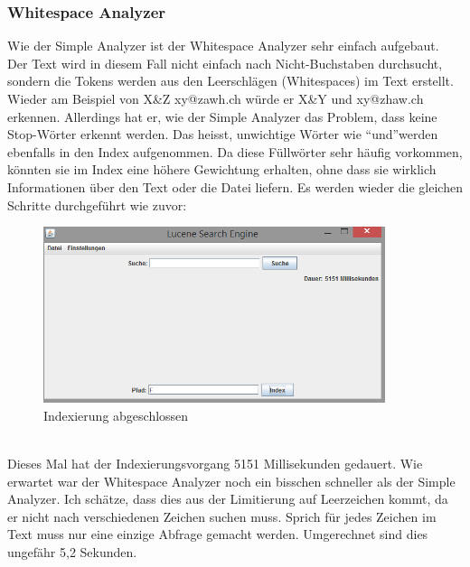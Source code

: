 \documentclass[12pt,a4paper,ngerman]{report}
\begin{document}
\subsubsection*{Whitespace Analyzer}
Wie der Simple Analyzer ist der Whitespace Analyzer sehr einfach aufgebaut. Der Text wird in diesem Fall nicht einfach nach Nicht-Buchstaben durchsucht, sondern die Tokens werden aus den Leerschlägen (Whitespaces) im Text erstellt. Wieder am Beispiel von X\&Z xy@zawh.ch würde er X\&Y und xy@zhaw.ch erkennen. Allerdings hat er, wie der Simple Analyzer das Problem, dass keine Stop-Wörter erkennt werden. Das heisst, unwichtige Wörter wie \textquotedblleft und\textquotedblright werden ebenfalls in den Index aufgenommen. Da diese Füllwörter sehr häufig vorkommen, könnten sie im Index eine höhere Gewichtung erhalten, ohne dass sie wirklich Informationen über den Text oder die Datei liefern.
\newpage
Es werden wieder die gleichen Schritte durchgeführt wie zuvor:
\begin{figure}[h!]
\centering
\includegraphics[width=10cm]{img/whitespace-analyzer-index.png}
\caption{Indexierung abgeschlossen\protect\footnotemark}
\end{figure}
\\
Dieses Mal hat der Indexierungsvorgang 5151 Millisekunden gedauert. Wie erwartet war der Whitespace Analyzer noch ein bisschen schneller als der Simple Analyzer. Ich schätze, dass dies aus der Limitierung auf Leerzeichen kommt, da er nicht nach verschiedenen Zeichen suchen muss. Sprich für jedes Zeichen im Text muss nur eine einzige Abfrage gemacht werden. Umgerechnet sind dies ungefähr 5,2 Sekunden.
\end{document}
